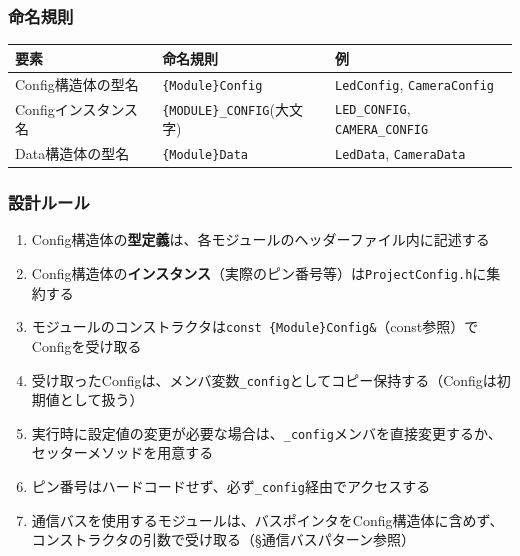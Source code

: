 \subsubsection{命名規則}

\begin{tabularx}{\textwidth}{l l X}
\toprule
\textbf{要素} & \textbf{命名規則} & \textbf{例} \\
\midrule
Config構造体の型名 & \texttt{\{Module\}Config} & \texttt{LedConfig}, \texttt{CameraConfig} \\
Configインスタンス名 & \texttt{\{MODULE\}\_CONFIG}(大文字) & \texttt{LED\_CONFIG}, \texttt{CAMERA\_CONFIG} \\
Data構造体の型名 & \texttt{\{Module\}Data} & \texttt{LedData}, \texttt{CameraData} \\
\bottomrule
\end{tabularx}

\subsubsection{設計ルール}

\begin{enumerate}
    \item Config構造体の\textbf{型定義}は、各モジュールのヘッダーファイル内に記述する
    \item Config構造体の\textbf{インスタンス}（実際のピン番号等）は\texttt{ProjectConfig.h}に集約する
    \item モジュールのコンストラクタは\texttt{const \{Module\}Config\&}（const参照）でConfigを受け取る
    \item 受け取ったConfigは、メンバ変数\texttt{\_config}としてコピー保持する（Configは初期値として扱う）
    \item 実行時に設定値の変更が必要な場合は、\texttt{\_config}メンバを直接変更するか、セッターメソッドを用意する
    \item ピン番号はハードコードせず、必ず\texttt{\_config}経由でアクセスする
    \item 通信バスを使用するモジュールは、バスポインタをConfig構造体に含めず、コンストラクタの引数で受け取る（§通信バスパターン参照）
\end{enumerate}

